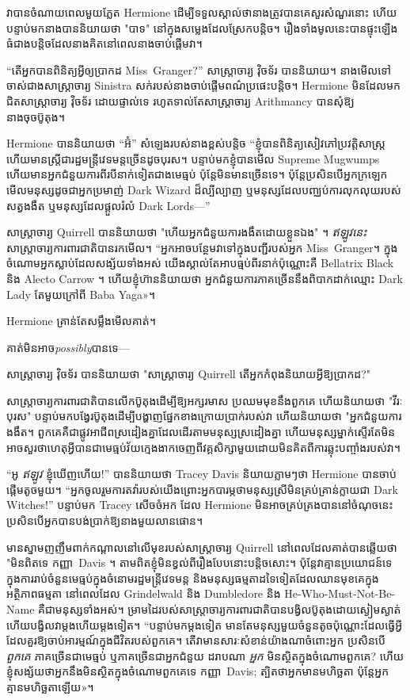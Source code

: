 វាបានចំណាយពេលមួយភ្លែត Hermione ដើម្បីទទួលស្គាល់ថានាងត្រូវបានគេសួរសំណួរនោះ ហើយបន្ទាប់មកនាងបាននិយាយថា "បាទ" នៅក្នុងសម្លេងដែលស្រែកបន្តិច។ រឿងទាំងមូលនេះបានផ្ទុះឡើងធំជាងបន្តិចដែលនាងគិតនៅពេលនាងចាប់ផ្តើមវា។

“តើ​អ្នក​បាន​ពិនិត្យ​អ្វី​ឲ្យ​ប្រាកដ Miss~Granger?” សាស្ត្រាចារ្យ វ៉ិចទ័រ បាននិយាយ។ នាងមើលទៅចាស់ជាងសាស្រ្តាចារ្យ Sinistra សក់របស់នាងចាប់ផ្តើមពណ៌ប្រផេះបន្តិច។ Hermione មិនដែលមកជិតសាស្រ្តាចារ្យ វ៉ិចទ័រ ដោយផ្ទាល់ទេ រហូតទាល់តែសាស្រ្តាចារ្យ Arithmancy បានសុំឱ្យនាងចុចប៊ូតុង។

Hermione បាននិយាយថា “អ៊ំ” សំឡេងរបស់នាងខ្ពស់បន្តិច “ខ្ញុំបានពិនិត្យសៀវភៅប្រវត្តិសាស្ត្រ ហើយមានស្ត្រីជារដ្ឋមន្ត្រីវេទមន្តច្រើនដូចបុរស។ បន្ទាប់មកខ្ញុំបានមើល Supreme Mugwumps ហើយមានអ្នកជំនួយការពីរបីនាក់ទៀតជាងមេធ្មប់ ប៉ុន្តែមិនមានច្រើនទេ។ ប៉ុន្តែប្រសិនបើអ្នកក្រឡេកមើលមនុស្សដូចជាអ្នកប្រមាញ់ Dark Wizard ដ៏ល្បីល្បាញ ឬមនុស្សដែលបញ្ឈប់ការលុកលុយរបស់សត្វងងឹត ឬមនុស្សដែលផ្តួលរំលំ Dark Lords—”

សាស្រ្តាចារ្យ Quirrell បាននិយាយថា "ហើយអ្នកជំនួយការងងឹតដោយខ្លួនឯង" ។ \emph{ឥឡូវនេះ} សាស្ត្រាចារ្យការពារជាតិបានរកមើល។ “អ្នកអាចបន្ថែមវាទៅក្នុងបញ្ជីរបស់អ្នក Miss~Granger។ ក្នុងចំណោមអ្នកស្លាប់ដែលសង្ស័យទាំងអស់ យើងស្គាល់តែអាបធ្មប់ពីរនាក់ប៉ុណ្ណោះគឺ Bellatrix Black និង Alecto Carrow ។ ហើយ​ខ្ញុំ​ហ៊ាន​និយាយ​ថា អ្នក​ជំនួយការ​ភាគច្រើន​នឹង​ពិបាក​ដាក់​ឈ្មោះ​ Dark Lady តែមួយ​ក្រៅពី Baba Yaga»។

Hermione គ្រាន់តែសម្លឹងមើលគាត់។

គាត់មិនអាច\emph{possibly}បានទេ—

សាស្ត្រាចារ្យ វ៉ិចទ័រ បាននិយាយថា "សាស្ត្រាចារ្យ Quirrell តើអ្នកកំពុងនិយាយអ្វីឱ្យប្រាកដ?"

សាស្ត្រាចារ្យការពារជាតិបានលើកប៊ូតុងដើម្បីឱ្យអក្សរមាស \SPHEW ប្រឈមមុខនឹងពួកគេ ហើយនិយាយថា "វីរៈបុរស" បន្ទាប់មកបង្វែរប៊ូតុងដើម្បីបង្ហាញផ្នែកខាងក្រោយប្រាក់របស់វា ហើយនិយាយថា "អ្នកជំនួយការងងឹត។ ពួកគេគឺជាផ្លូវអាជីពស្រដៀងគ្នាដែលដើរតាមមនុស្សស្រដៀងគ្នា ហើយមនុស្សម្នាក់ស្ទើរតែមិនអាចសួរថាហេតុអ្វីបានជាមេធ្មប់វ័យក្មេងងាកចេញពីវគ្គសិក្សាមួយដោយមិនគិតពីការឆ្លុះបញ្ចាំងរបស់វា។

“អូ \emph{ឥឡូវ} ខ្ញុំឃើញហើយ!” បាននិយាយថា Tracey Davis និយាយភ្លាមៗថា Hermione បានចាប់ផ្តើមតូចមួយ។ “អ្នក​ចូល​រួម​ការ​តវ៉ា​របស់​យើង​ព្រោះ​អ្នក​បារម្ភ​ថា​មនុស្ស​ស្រី​មិន​គ្រប់​គ្រាន់​ក្លាយ​ជា​ Dark Witches!” បន្ទាប់មក Tracey សើចចំអក ដែល Hermione មិនអាចគ្រប់គ្រងបាននៅចំណុចនេះ ប្រសិនបើអ្នកបានបង់ប្រាក់ឱ្យនាងមួយលានផោន។

មានស្នាមញញឹមពាក់កណ្តាលនៅលើមុខរបស់សាស្រ្តាចារ្យ Quirrell នៅពេលដែលគាត់បានឆ្លើយថា "មិនពិតទេ កញ្ញា~Davis ។ តាម​ពិត​ខ្ញុំ​មិន​ខ្វល់​ពី​រឿង​បែប​នោះ​បន្តិច​សោះ។ ប៉ុន្តែវាគ្មានប្រយោជន៍ទេក្នុងការរាប់ចំនួនមេធ្មប់ក្នុងចំនោមរដ្ឋមន្ត្រីវេទមន្ត និងមនុស្សធម្មតាដទៃទៀតដែលឈានមុខគេក្នុងអត្ថិភាពធម្មតា នៅពេលដែល Grindelwald និង Dumbledore និង He-Who-Must-Not-Be-Name គឺជាមនុស្សទាំងអស់។ ម្រាមដៃ​របស់​សាស្ត្រាចារ្យ​ការពារ​ជាតិ​បាន​បង្វិល​ប៊ូតុង​ដោយ​ស្ងៀមស្ងាត់ ហើយ​បង្វិល​វា​ម្តង​ហើយ​ម្តងទៀត។ “បន្ទាប់មកម្តងទៀត មានតែមនុស្សមួយចំនួនតូចប៉ុណ្ណោះដែលធ្វើអ្វីដែលគួរឱ្យចាប់អារម្មណ៍ក្នុងជីវិតរបស់ពួកគេ។ តើវាមានសារៈសំខាន់យ៉ាងណាចំពោះអ្នក ប្រសិនបើ \emph{ពួកគេ} ភាគច្រើនជាមេធ្មប់ ឬភាគច្រើនជាអ្នកជំនួយ ដរាបណា \emph{អ្នក} មិនស្ថិតក្នុងចំណោមពួកគេ? ហើយខ្ញុំសង្ស័យថាអ្នកនឹងមិនស្ថិតក្នុងចំណោមពួកគេទេ កញ្ញា~Davis; ត្បិត​ថា​អ្នក​មាន​មហិច្ឆតា ប៉ុន្តែ​អ្នក​គ្មាន​មហិច្ឆតា​ឡើយ»។

